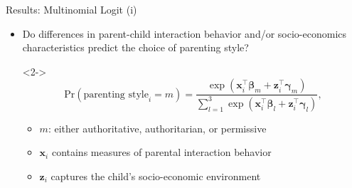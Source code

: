 \documentclass[notes, 12.5pt, aspectratio=169]{beamer}
\newcommand{\be}{\bm{\beta}}
\newcommand{\x}{\textbf{x}}
\newcommand{\z}{\textbf{z}}
\begin{document}
\begin{frame}{Results: Multinomial Logit (i)}
	\begin{itemize}[(I)]
		\item<1-> Do differences in parent-child interaction behavior and/or socio-economics characteristics predict the choice of parenting style?
		\item[]<2-> \begin{equation*} \text{Pr}(\text{parenting style}_i = m) = \frac{\exp(\x^\top_{i} \be_m + \z^\top_{i} \bm{\gamma}_m)}{\sum_{l=1}^{3} \exp(\x^\top_{i}\be_l + \z^\top_{i} \bm{\gamma}_l)},  \label{eq:multinom}
		\end{equation*}
		\begin{itemize}
			\item <2-> $m$: either authoritative, authoritarian, or permissive
			\item <2-> $\x_i$ contains measures of parental interaction behavior
			\item <2-> $\z_i$ captures the child's socio-economic environment
		\end{itemize} 
	\end{itemize}
\end{frame}
\end{document}
